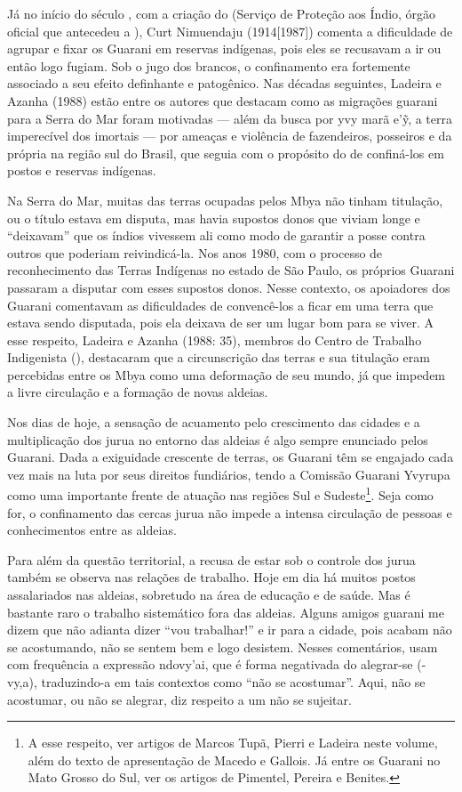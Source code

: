 Já no início do século , com a criação do  (Serviço de Proteção aos
Índio, órgão oficial que antecedeu a ), Curt Nimuendaju
(1914[1987]) comenta a dificuldade de agrupar e fixar os Guarani em
reservas indígenas, pois eles se recusavam a ir ou então logo fugiam.
Sob o jugo dos brancos, o confinamento era fortemente associado a seu
efeito definhante e patogênico. Nas décadas seguintes, Ladeira e Azanha
(1988) estão entre os autores que destacam como as migrações guarani
para a Serra do Mar foram motivadas — além da busca por yvy marã
e’\~{y}, a terra imperecível dos imortais — por ameaças e violência de
fazendeiros, posseiros e da própria  na região sul do Brasil, que
seguia com o propósito do  de confiná-los em postos e reservas
indígenas.

Na Serra do Mar, muitas das terras ocupadas pelos Mbya não tinham
titulação, ou o título estava em disputa, mas havia supostos donos que
viviam longe e ``deixavam'' que os índios vivessem ali como modo de
garantir a posse contra outros que poderiam reivindicá-la. Nos anos
1980, com o processo de reconhecimento das Terras Indígenas no estado
de São Paulo, os próprios Guarani passaram a disputar com esses
supostos donos. Nesse contexto, os apoiadores dos Guarani comentavam as
dificuldades de convencê-los a ficar em uma terra que estava sendo
disputada, pois ela deixava de ser um lugar bom para se viver. A esse
respeito, Ladeira e Azanha (1988: 35), membros do Centro de Trabalho
Indigenista (), destacaram que a circunscrição das terras e sua
titulação eram percebidas entre os Mbya como uma deformação de seu
mundo, já que impedem a livre circulação e a formação de novas aldeias.

Nos dias de hoje, a sensação de acuamento pelo crescimento das cidades e
a multiplicação dos jurua no entorno das aldeias é algo sempre
enunciado pelos Guarani. Dada a exiguidade crescente de terras, os
Guarani têm se engajado cada vez mais na luta por seus direitos
fundiários, tendo a Comissão Guarani Yvyrupa como uma importante frente
de atuação nas regiões Sul e Sudeste\footnote{A esse respeito, ver
artigos de Marcos Tupã, Pierri e Ladeira neste volume, além do texto de
apresentação de Macedo e Gallois. Já entre os Guarani no Mato Grosso do
Sul, ver os artigos de Pimentel, Pereira e Benites.}. Seja como for, o
confinamento das cercas jurua não impede a intensa circulação de
pessoas e conhecimentos entre as aldeias. 

Para além da questão territorial, a recusa de estar sob o controle dos
jurua também se observa nas relações de trabalho. Hoje em dia há muitos
postos assalariados nas aldeias, sobretudo na área de educação e de
saúde. Mas é bastante raro o trabalho sistemático fora das aldeias.
Alguns amigos guarani me dizem que não adianta dizer ``vou trabalhar!'' e
ir para a cidade, pois acabam não se acostumando, não se sentem bem e
logo desistem. Nesses comentários, usam com frequência a expressão
ndovy’ai, que é forma negativada do alegrar-se (-vy,a), traduzindo-a em
tais contextos como ``não se acostumar''. Aqui, não se acostumar, ou não
se alegrar, diz respeito a um não se sujeitar.

